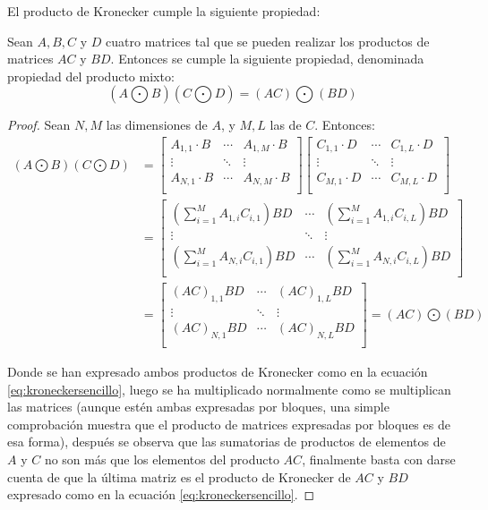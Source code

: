 El producto de Kronecker cumple la siguiente propiedad:

\begin{prop} \label{prop:productoMixto}
Sean $A,B,C$ y $D$ cuatro matrices tal que se pueden realizar los productos de matrices $AC$ y $BD$. Entonces se cumple la siguiente propiedad, denominada propiedad del producto mixto:
$$
(A \bigodot B)(C \bigodot D) = (AC) \bigodot (BD)
$$
\end{prop}
\begin{proof}
Sean $N,M$ las dimensiones de $A$, y $M,L$ las de $C$. Entonces:
\begin{align*}
(A \bigodot B)(C \bigodot D) &= 
\begin{bmatrix}
A_{1,1} \cdot B & \cdots  & A_{1,M} \cdot B \\
\vdots & \ddots & \vdots\\
A_{N,1} \cdot B & \cdots  & A_{N,M} \cdot B \\
\end{bmatrix}
\begin{bmatrix}
C_{1,1} \cdot D & \cdots  & C_{1,L} \cdot D \\
\vdots & \ddots & \vdots\\
C_{M,1} \cdot D & \cdots  & C_{M,L} \cdot D \\
\end{bmatrix} \\
&= 
\begin{bmatrix}
(\sum_{i=1}^M A_{1,i}C_{i,1})BD & \cdots  & (\sum_{i=1}^M A_{1,i}C_{i,L})BD \\
\vdots & \ddots & \vdots\\
(\sum_{i=1}^M A_{N,i}C_{i,1})BD & \cdots  & (\sum_{i=1}^M A_{N,i}C_{i,L})BD \\
\end{bmatrix} \\
&= 
\begin{bmatrix}
(AC)_{1,1}BD & \cdots  & (AC)_{1,L}BD \\
\vdots & \ddots & \vdots\\
(AC)_{N,1}BD & \cdots  & (AC)_{N,L}BD \\
\end{bmatrix} = (AC) \bigodot (BD)
\end{align*}

Donde se han expresado ambos productos de Kronecker como en la ecuación \eqref{eq:kroneckersencillo}, luego se ha multiplicado normalmente como se multiplican las matrices (aunque estén ambas expresadas por bloques, una simple comprobación muestra que el producto de matrices expresadas por bloques es de esa forma), después se observa que las sumatorias de productos de elementos de $A$ y $C$ no son más que los elementos del producto $AC$, finalmente basta con darse cuenta de que la última matriz es el producto de Kronecker de $AC$ y $BD$ expresado como en la ecuación \eqref{eq:kroneckersencillo}.
\end{proof}

